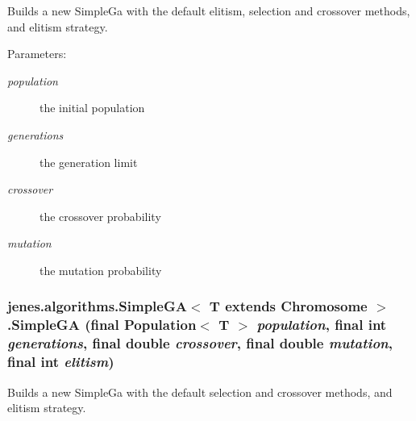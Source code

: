 Builds a new SimpleGa with the default elitism, selection and crossover methods, and elitism strategy. 

\begin{Desc}
\item[Parameters:]
\begin{description}
\item[{\em population}]the initial population \item[{\em generations}]the generation limit \item[{\em crossover}]the crossover probability \item[{\em mutation}]the mutation probability \end{description}
\end{Desc}
\hypertarget{classjenes_1_1algorithms_1_1_simple_g_a_3_01_t_01extends_01_chromosome_01_4_659f0192b24b5d8af22f73f190b67867}{
\subsubsection[SimpleGA]{\setlength{\rightskip}{0pt plus 5cm}jenes.algorithms.SimpleGA$<$ T extends Chromosome $>$.SimpleGA (final Population$<$ T $>$ {\em population}, \/  final int {\em generations}, \/  final double {\em crossover}, \/  final double {\em mutation}, \/  final int {\em elitism})}}
\label{classjenes_1_1algorithms_1_1_simple_g_a_3_01_t_01extends_01_chromosome_01_4_659f0192b24b5d8af22f73f190b67867}


Builds a new SimpleGa with the default selection and crossover methods, and elitism strategy. 

